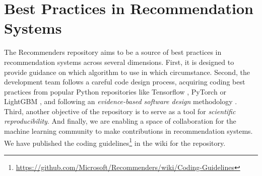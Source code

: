 \section{Best Practices in Recommendation Systems}

The Recommenders repository aims to be a source of best practices in recommendation systems
across several dimensions. First, it is designed to provide guidance on 
which algorithm to use in which circumstance. 
Second, the development team follows a careful code design process, acquiring 
coding best practices from popular Python repositories like Tensorflow 
\cite{abadi2016tensorflow}, PyTorch \cite{paszke2017automatic} or LightGBM 
\cite{ke2017lightgbm}, and following an {\em evidence-based software design} methodology 
\cite{joeglekar2018evidence}. Third, another objective of the repository
is to serve as a tool for {\em scientific reproducibility}. And finally, we are enabling a 
space of collaboration for the machine learning community to make
contributions in recommendation systems.
We have published the coding 
guidelines\footnote{\url{https://github.com/Microsoft/Recommenders/wiki/Coding-Guidelines}\label{foot_code_guidelines}} 
in the wiki for the repository. 





